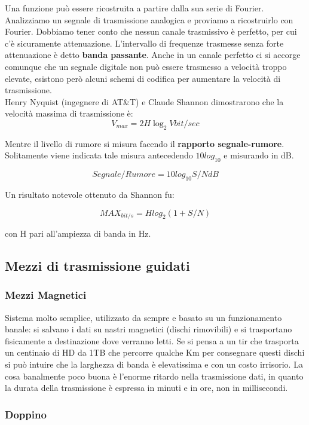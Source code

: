 Una funzione può essere ricostruita  a partire dalla sua serie di Fourier. Analizziamo un segnale di trasmissione analogica e proviamo a ricostruirlo con Fourier. Dobbiamo tener conto che nessun canale trasmissivo è perfetto, per cui c'è sicuramente attenuazione. L'intervallo di frequenze trasmesse senza forte attenuazione è detto \textbf{banda passante}. Anche in un canale perfetto ci si accorge comunque che un segnale digitale non può essere trasmesso a velocità troppo elevate, esistono però alcuni schemi di codifica per aumentare la velocità di trasmissione.\\
Henry Nyquist (ingegnere di AT\&T) e Claude Shannon dimostrarono che la velocità massima di trasmissione è:\\

\[V_{max} = 2H\log_{2}V bit/sec\]

Mentre il livello di rumore si misura facendo il \textbf{rapporto segnale-rumore}. Solitamente viene indicata tale misura antecedendo \(10log_{10}\) e misurando in dB.

\[Segnale/Rumore = 10log_{10} S/N dB\]

Un risultato notevole ottenuto da Shannon fu:

\[MAX_{bit/s} = H log_{2}(1 + S/N)\]

con H pari all'ampiezza di banda in Hz.

\subsection{Mezzi di trasmissione guidati}

\subsubsection{Mezzi Magnetici}

Sistema molto semplice, utilizzato da sempre e basato su un funzionamento banale: si salvano i dati su nastri magnetici (dischi rimovibili) e si trasportano fisicamente a destinazione dove verranno letti. Se si pensa a un tir che trasporta un centinaio di HD da 1TB che percorre qualche Km per consegnare questi dischi si può intuire che la larghezza di banda è elevatissima e con un costo irrisorio. La cosa banalmente poco buona è l'enorme ritardo nella trasmissione dati, in quanto la durata della trasmissione è espressa in minuti e in ore, non in millisecondi.

\subsubsection{Doppino}

